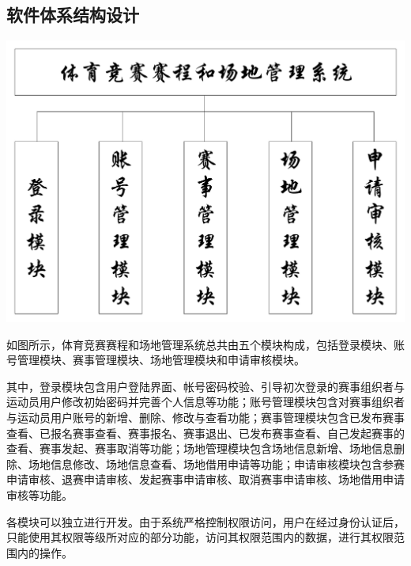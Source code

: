 \documentclass[a4paper,UTF8]{article}
\begin{document}
\subsection{软件体系结构设计}
{\centering\includegraphics[width=1\columnwidth]{1}
	
}

如图所示，体育竞赛赛程和场地管理系统总共由五个模块构成，包括登录模块、账号管理模块、赛事管理模块、场地管理模块和申请审核模块。

其中，登录模块包含用户登陆界面、帐号密码校验、引导初次登录的赛事组织者与运动员用户修改初始密码并完善个人信息等功能；账号管理模块包含对赛事组织者与运动员用户账号的新增、删除、修改与查看功能；赛事管理模块包含已发布赛事查看、已报名赛事查看、赛事报名、赛事退出、已发布赛事查看、自己发起赛事的查看、赛事发起、赛事取消等功能；场地管理模块包含场地信息新增、场地信息删除、场地信息修改、场地信息查看、场地借用申请等功能；申请审核模块包含参赛申请审核、退赛申请审核、发起赛事申请审核、取消赛事申请审核、场地借用申请审核等功能。

各模块可以独立进行开发。由于系统严格控制权限访问，用户在经过身份认证后，只能使用其权限等级所对应的部分功能，访问其权限范围内的数据，进行其权限范围内的操作。
\end{document}
